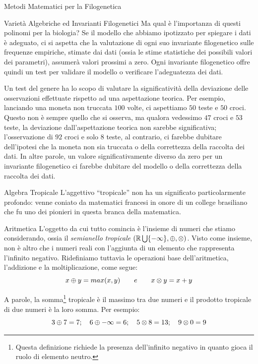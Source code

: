 \documentclass{article}
\begin{document}
\begin{section}{Metodi Matematici per la Filogenetica}
\begin{subsection}{Varietà Algebriche ed Invarianti Filogenetici}
			Ma qual è l’importanza di questi polinomi per la biologia? 
			Se il modello che abbiamo ipotizzato per spiegare i dati è adeguato, ci si aspetta che la valutazione di ogni suo invariante filogenetico sulle frequenze empiriche, stimate dai dati (ossia le stime statistiche dei possibili valori dei parametri), assumerà valori prossimi a zero. Ogni invariante filogenetico offre quindi un test per validare il modello o verificare l’adeguatezza dei dati.
			
			Un test del genere ha lo scopo di valutare la significatività della deviazione delle osservazioni effettuate rispetto ad una aspettazione teorica. Per esempio, lanciando una moneta non truccata $100$ volte, ci aspettiamo $50$ teste e $50$ croci. Questo non è sempre quello che si osserva, ma qualora vedessimo $47$ croci e $53$ teste, la deviazione dall’aspettazione teorica non sarebbe significativa; l’osservazione di $92$ croci e solo $8$ teste, al contrario, ci farebbe dubitare dell’ipotesi che la moneta non sia truccata o della correttezza della raccolta dei dati. 
			In altre parole, un valore significativamente diverso da zero per un invariante filogenetico ci farebbe dubitare del modello o della correttezza della raccolta dei dati.
		\end{subsection}
		
		\begin{subsection}{Algebra Tropicale}
			L’aggettivo “tropicale” non ha un significato particolarmente profondo: venne coniato da matematici francesi in onore di un college brasiliano che fu uno dei pionieri in questa branca della matematica.
			
			\begin{subsubsection}{Aritmetica}
			L’oggetto da cui tutto comincia è l’insieme di numeri che stiamo considerando, ossia il \emph{semianello tropicale} $(\mathbb{R} \bigcup \{-\infty\}, \oplus, \otimes )$. Visto come insieme, non è altro che i numeri reali con l’aggiunta di un elemento che rappresenta l’infinito negativo.
			Ridefiniamo tuttavia le operazioni base dell’aritmetica, l’addizione e la moltiplicazione, come segue: $$ x\oplus y = max(x,y)   \qquad e \qquad   x\otimes y = x+y $$
			
			A parole, la somma\footnote{Questa definizione richiede la presenza dell’infinito negativo in quanto gioca il ruolo di elemento neutro.} tropicale è il massimo tra due numeri e il prodotto tropicale di due numeri è la loro somma. Per esempio: $$3\oplus 7 = 7; \quad 6\oplus -\infty = 6; \quad 5\otimes 8 = 13; \quad 9\otimes 0 = 9$$
			

\end{subsubsection}
\end{subsection}
\end{section}
\end{document}
